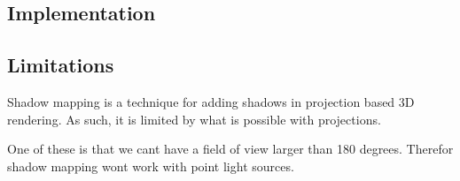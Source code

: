 \subsection{Implementation}

\subsection{Limitations}



Shadow mapping is a technique for adding shadows in projection based 
3D rendering. As such, it is limited by what is possible with projections.

One of these is that we cant have a field of view larger than 180
degrees. Therefor shadow mapping wont work with point
light sources.

